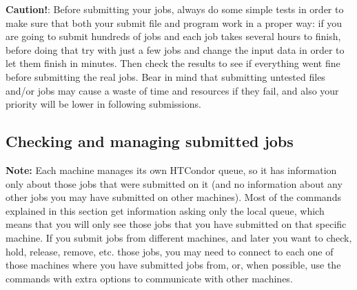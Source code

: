\documentclass[a4paper,10pt]{article}
\begin{document}
\begin{mdframed}
\textbf{Caution!}: Before submitting your jobs, always do some simple tests in
order to make sure that both your submit file and program work in a proper way:
if you are going to submit hundreds of jobs and each job takes several hours to
finish, before doing that try with just a few jobs and change the input data in
order to let them finish in minutes. Then check the results to see if everything
went fine before submitting the real jobs. Bear in mind that submitting untested
files and/or jobs may cause a waste of time and resources if they fail, and also
your priority will be lower in following submissions. 
\end{mdframed}



\subsection{Checking and managing submitted jobs}
\label{sec:orga6521f3}

\begin{mdframed}
\textbf{Note:} Each machine manages its own HTCondor queue, so it has information only
about those jobs that were submitted on it (and no information about any other
jobs you may have submitted on other machines). Most of the commands explained
in this section get information asking only the local queue, which means that
you will only see those jobs that you have submitted on that specific
machine. If you submit jobs from different machines, and later you want to
check, hold, release, remove, etc. those jobs, you may need to connect to each
one of those machines where you have submitted jobs from, or, when possible, use
the commands with extra options to communicate with other machines.
\end{mdframed}
\end{document}
